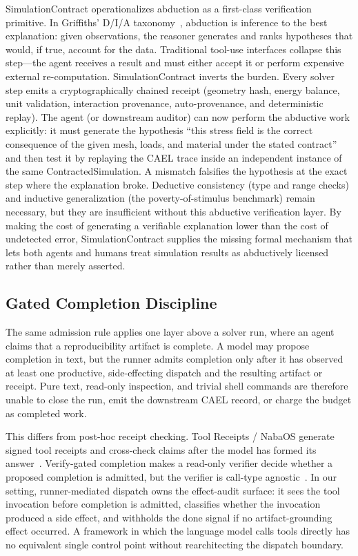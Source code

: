 \documentclass[journal]{IEEEtran}
\newcommand{\cael}{CAEL}
\begin{document}
SimulationContract operationalizes abduction as a first-class verification
primitive. In Griffiths' D/I/A taxonomy~\cite{griffiths2026lawsofthought},
abduction is inference to the best explanation: given observations, the
reasoner generates and ranks hypotheses that would, if true, account for
the data. Traditional tool-use interfaces collapse this step---the agent
receives a result and must either accept it or perform expensive external
re-computation. SimulationContract inverts the burden. Every solver step
emits a cryptographically chained receipt (geometry hash, energy balance,
unit validation, interaction provenance, auto-provenance, and deterministic
replay). The agent (or downstream auditor) can now perform the abductive
work explicitly: it must generate the hypothesis ``this stress field is
the correct consequence of the given mesh, loads, and material under the
stated contract'' and then test it by replaying the CAEL trace inside an
independent instance of the same ContractedSimulation. A mismatch
falsifies the hypothesis at the exact step where the explanation broke.
Deductive consistency (type and range checks) and inductive generalization
(the poverty-of-stimulus benchmark) remain necessary, but they are
insufficient without this abductive verification layer. By making the cost
of generating a verifiable explanation lower than the cost of undetected
error, SimulationContract supplies the missing formal mechanism that lets
both agents and humans treat simulation results as abductively licensed
rather than merely asserted.

\subsection{Gated Completion Discipline}
\label{sec:model:gated-completion}

The same admission rule applies one layer above a solver run, where an
agent claims that a reproducibility artifact is complete. A model may
propose completion in text, but the runner admits completion only after it
has observed at least one productive, side-effecting dispatch and the
resulting artifact or receipt. Pure text, read-only inspection, and trivial
shell commands are therefore unable to close the run, emit the downstream
\cael{} record, or charge the budget as completed work.

This differs from post-hoc receipt checking. Tool Receipts / NabaOS
generate signed tool receipts and cross-check claims after the model has
formed its answer~\cite{toolreceipts2026}. Verify-gated completion makes a
read-only verifier decide whether a proposed completion is admitted, but
the verifier is call-type agnostic~\cite{verifygatedcompletion2026}. In
our setting, runner-mediated dispatch owns the effect-audit surface: it
sees the tool invocation before completion is admitted, classifies whether
the invocation produced a side effect, and withholds the done signal if no
artifact-grounding effect occurred. A framework in which the language
model calls tools directly has no equivalent single control point without
rearchitecting the dispatch boundary.
\end{document}
